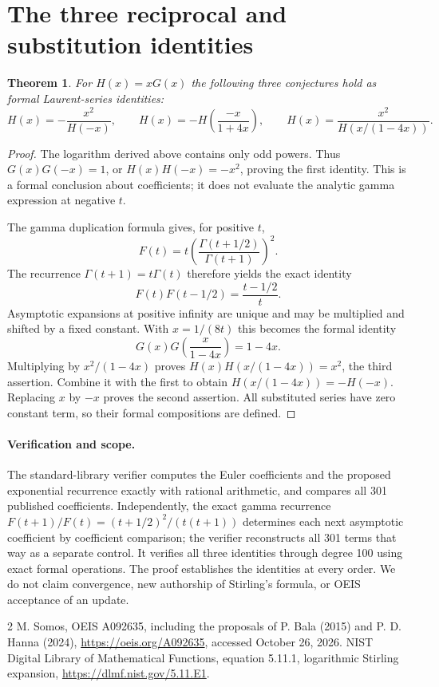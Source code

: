 \documentclass[10pt]{article}
\newtheorem{theorem}{Theorem}
\begin{document}
\section{The three reciprocal and substitution identities}
\begin{theorem}
For $H(x)=xG(x)$ the following three conjectures hold as formal
Laurent-series identities:
\[
 H(x)=-\frac{x^2}{H(-x)},\qquad
 H(x)=-H\left(\frac{-x}{1+4x}\right),\qquad
 H(x)=\frac{x^2}{H(x/(1-4x))}.
\]
\end{theorem}
\begin{proof}
The logarithm derived above contains only odd powers. Thus
$G(x)G(-x)=1$, or $H(x)H(-x)=-x^2$, proving the first identity.
This is a formal conclusion about coefficients; it does not
evaluate the analytic gamma expression at negative $t$.

The gamma duplication formula gives, for positive $t$,
\[
 F(t)=t\left(\frac{\Gamma(t+1/2)}{\Gamma(t+1)}\right)^2.
\]
The recurrence $\Gamma(t+1)=t\Gamma(t)$ therefore yields the
exact identity
\[
 F(t)F(t-1/2)=\frac{t-1/2}{t}.
\]
Asymptotic expansions at positive infinity are unique and may be
multiplied and shifted by a fixed constant. With $x=1/(8t)$ this
becomes the formal identity
\[
 G(x)G\left(\frac{x}{1-4x}\right)=1-4x.
\]
Multiplying by $x^2/(1-4x)$ proves
$H(x)H(x/(1-4x))=x^2$, the third assertion.
Combine it with the first to obtain
$H(x/(1-4x))=-H(-x)$. Replacing $x$ by $-x$ proves the second
assertion. All substituted series have zero constant term, so
their formal compositions are defined.
\end{proof}
\paragraph{Verification and scope.}
The standard-library verifier computes the Euler coefficients and
the proposed exponential recurrence exactly with rational arithmetic,
and compares all 301 published coefficients. Independently, the
exact gamma recurrence
$F(t+1)/F(t)=(t+1/2)^2/(t(t+1))$ determines each next asymptotic
coefficient by coefficient comparison; the verifier reconstructs
all 301 terms that way as a separate control. It verifies all
three identities through degree 100 using exact formal operations.
The proof establishes the identities at every order. We do not
claim convergence, new authorship of Stirling's formula, or OEIS
acceptance of an update.
\begin{thebibliography}{2}
 M. Somos, OEIS A092635, including the proposals of
P. Bala (2015) and P. D. Hanna (2024),
\url{https://oeis.org/A092635}, accessed October 26, 2026.
 NIST Digital Library of Mathematical Functions,
equation 5.11.1, logarithmic Stirling expansion,
\url{https://dlmf.nist.gov/5.11.E1}.
\end{thebibliography}
\end{document}
